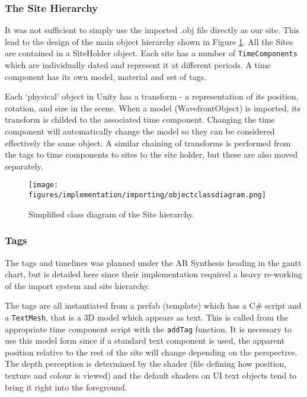 \documentclass[12pt, a4paper]{article}
\begin{document}
\subsubsection{The Site Hierarchy}
It was not sufficient to simply use the imported .obj file directly as our site. This lead to the design of the main object hierarchy shown in Figure \ref{fig:hierarchydiagram}. All the Sites are contained in a SiteHolder object. Each site has a number of \verb|TimeComponents| which are individually dated and represent it at different periods. A time component has its own model, material and set of tags. 

Each `physical' object in Unity has a transform - a representation of its position, rotation, and size in the scene.  When a model (WavefrontObject) is imported, its transform is childed to the associated time component. Changing the time component will automatically change the model so they can be considered effectively the same object. A similar chaining of transforms is performed from the tags to time components to sites to the site holder, but these are also moved separately.

\begin{figure}[h]
    \centering
    \texttt{[image: figures/implementation/importing/objectclassdiagram.png]}
        \caption{Simplified class diagram of the Site hierarchy.}
        \label{fig:hierarchydiagram}
\end{figure}

\subsubsection{Tags}
The tags and timelines was planned under the AR Synthesis heading in the gantt chart, but is detailed here since their implementation required a heavy re-working of the import system and site hierarchy. 

The tags are all instantiated from a prefab (template) which has a C\# script and a \verb|TextMesh|, that is a 3D model which appears as text. This is called from the appropriate time component script with the \verb|addTag| function. It is necessary to use this model form since if a standard text component is used, the apparent position relative to the rest of the site will change depending on the perspective. The depth perception is determined by the shader (file defining how position, texture and colour is viewed) and the default shaders on UI text objects tend to bring it right into the foreground.
\end{document}
